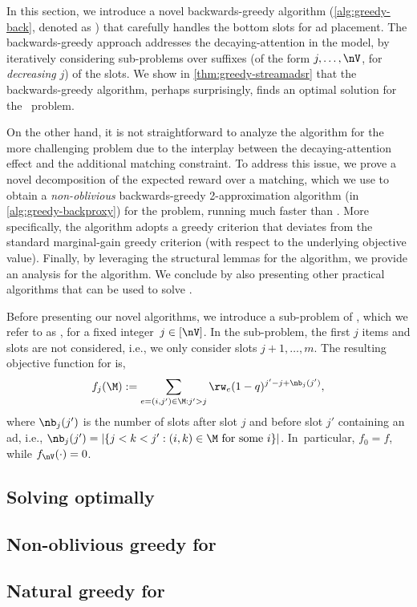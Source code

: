 In this section, we introduce a novel backwards-greedy algorithm
(\cref{alg:greedy-back}, denoted as \alggback) that carefully handles the bottom slots
for ad placement.
The backwards-greedy approach addresses %
the decaying-attention in the model, 
by iteratively considering
sub-problems over suffixes (of the form $j,\dots,\nV$, for \emph{decreasing} $j$) of the slots. %
We show in \cref{thm:greedy-streamadsr} that the backwards-greedy algorithm, perhaps surprisingly, 
finds an optimal solution for the \streamadsr~problem.


On the other hand, 
it is not straightforward to
analyze the \alggback algorithm for the more challenging \streamads problem 
due to the interplay between the decaying-attention effect and the additional matching constraint. %
To address this issue, we prove a novel decomposition of the expected reward over a matching, 
which we use to obtain a \emph{non-oblivious} backwards-greedy 2-approximation algorithm
(\alggbackproxy in \cref{alg:greedy-backproxy}) for the \streamads problem, 
running much faster than \alggback.
More specifically, 
the \alggbackproxy algorithm adopts a greedy criterion that deviates from the standard marginal-gain greedy criterion (with respect to the underlying objective value). %
Finally, by leveraging the structural lemmas for the \alggbackproxy algorithm, 
we provide an analysis for the \alggback algorithm. %
We conclude by also presenting other practical algorithms that can be used to solve \streamads.

Before presenting our novel algorithms,
we
introduce a sub-problem of \streamads, 
which we refer to as \streamadsj, for a fixed integer~$j\in[\nV]$.
In the \streamadsj sub-problem,
the first $j$ items and slots are not considered, i.e., we only consider slots $j+1,\dots,m$.
The resulting objective function for \streamadsj is,
\begin{align}
	f_j(\M) := \sum_{e=(i,j') \in \M: j' > j} \rw_{e} (1-q)^{j'-j + \nb_j(j')}, \label{eq:obj-j}
\end{align}
where $\nb_j(j')$ is the number of slots after slot $j$ and before slot $j'$ containing an ad,
i.e.,
$\nb_j(j')= |\{ j < k < j' : (i, k) \in \M \text{ for some } i \}|$.
In~particular, 
$f_0 = f$, while 
$f_{\nV}(\cdot) = 0$. %

\subsection{Solving \streamadsr optimally}\label{sec:algs:streamadsr}




\subsection{Non-oblivious greedy for \streamads}\label{sec:algs:streamads}




\subsection{Natural greedy for \streamads}\label{sec:algs:streamads:oblivious}


